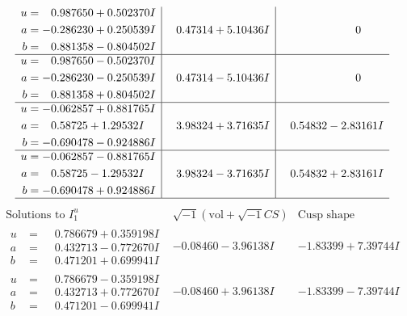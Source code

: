 \documentclass[1p]{elsarticle_modified}
\theoremstyle{definition}
\newcommand{\I}{\sqrt{-1}}
\begin{document}
$$\begin{array}{c|c|c}
\begin{aligned}
u &= \phantom{-}0.987650 + 0.502370 I \\
a &= -0.286230 + 0.250539 I \\
b &= \phantom{-}0.881358 - 0.804502 I\end{aligned}
 & \phantom{-}0.47314 + 5.10436 I & \phantom{-0.000000 } 0 \\ \hline\begin{aligned}
u &= \phantom{-}0.987650 - 0.502370 I \\
a &= -0.286230 - 0.250539 I \\
b &= \phantom{-}0.881358 + 0.804502 I\end{aligned}
 & \phantom{-}0.47314 - 5.10436 I & \phantom{-0.000000 } 0 \\ \hline\begin{aligned}
u &= -0.062857 + 0.881765 I \\
a &= \phantom{-}0.58725 + 1.29532 I \\
b &= -0.690478 - 0.924886 I\end{aligned}
 & \phantom{-}3.98324 + 3.71635 I & \phantom{-}0.54832 - 2.83161 I \\ \hline\begin{aligned}
u &= -0.062857 - 0.881765 I \\
a &= \phantom{-}0.58725 - 1.29532 I \\
b &= -0.690478 + 0.924886 I\end{aligned}
 & \phantom{-}3.98324 - 3.71635 I & \phantom{-}0.54832 + 2.83161 I\\
 \hline 
 \end{array}$$\newpage$$\begin{array}{c|c|c}  
\text{Solutions to }I^u_{1}& \I (\text{vol} + \sqrt{-1}CS) & \text{Cusp shape}\\
 \hline 
\begin{aligned}
u &= \phantom{-}0.786679 + 0.359198 I \\
a &= \phantom{-}0.432713 - 0.772670 I \\
b &= \phantom{-}0.471201 + 0.699941 I\end{aligned}
 & -0.08460 - 3.96138 I & -1.83399 + 7.39744 I \\ \hline\begin{aligned}
u &= \phantom{-}0.786679 - 0.359198 I \\
a &= \phantom{-}0.432713 + 0.772670 I \\
b &= \phantom{-}0.471201 - 0.699941 I\end{aligned}
 & -0.08460 + 3.96138 I & -1.83399 - 7.39744 I \\ \hline\begin{aligned}

\end{aligned}
\end{array}$$
\end{document}
